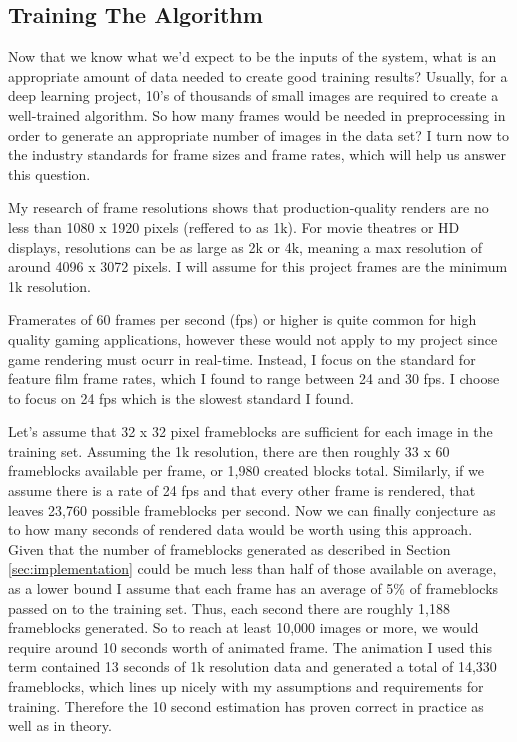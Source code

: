 \documentclass[conference]{IEEEtran}
\begin{document}
\subsection{Training The Algorithm}
\label{subsec:training_the_algorithm}
Now that we know what we'd expect to be the inputs of the system, what is an
appropriate amount of data needed to create good training results?
Usually, for a deep learning project, 10's of thousands of small images
are required to create a well-trained algorithm.
So how many frames would be needed in preprocessing in order to generate an appropriate
number of images in the data set? I turn now to the industry standards for frame sizes
and frame rates, which will help us answer this question.

My research of frame resolutions shows that production-quality
renders are no less than 1080 x 1920 pixels (reffered to as 1k). For movie
theatres or HD displays, resolutions can be as large as 2k or 4k, meaning a max
resolution of around 4096 x 3072 pixels. I will assume for this project frames are the
minimum 1k resolution.

Framerates of 60 frames per second (fps) or higher is quite common for high quality gaming applications,
however these would not apply to my project since game rendering must ocurr in
real-time.
Instead, I focus on the standard for feature film frame rates, which I found to
range between 24 and 30 fps. I choose to focus on 24 fps which is the slowest
standard I found.

Let's assume that 32 x 32 pixel frameblocks are sufficient for each image in the
training set.
Assuming the 1k resolution, there are then roughly 33 x 60 frameblocks available per frame,
or 1,980 created blocks total.
Similarly, if we assume there is a rate of 24 fps and that every other frame is
rendered,
that leaves 23,760 possible frameblocks per second.
Now we can finally conjecture as to how many seconds of rendered data would be
worth using this approach.
Given that the number of frameblocks generated as described in Section
\ref{sec:implementation} could be much less than half of those available on
average, as a lower bound I assume that each frame has an average of 5\% of frameblocks passed
on to the training set. Thus, each second there are roughly 1,188 frameblocks
generated. So to reach at least 10,000 images or more, we would require around
10 seconds worth of animated frame.
The animation I used this term contained 13 seconds of 1k resolution data and generated
a total of 14,330 frameblocks, which lines up nicely with my assumptions and
requirements for training. Therefore the 10 second estimation has proven correct
in practice as well as in theory.
\end{document}
